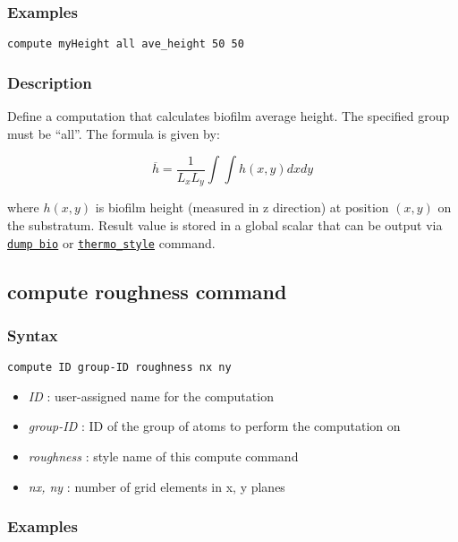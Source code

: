 \documentclass[11pt,a4paper,openright]{article}
\begin{document}
\subsubsection*{Examples}

\begin{Verbatim}[frame=single]
compute myHeight all ave_height 50 50
\end{Verbatim}

\subsubsection*{Description}

Define a computation that calculates biofilm average height. 
The specified group must be  ``all''.
The formula is given by:

\[ \overline{h} = \frac{1}{L_xL_y} \int\int h(x,y)dxdy \]

where $h(x,y)$ is biofilm height (measured in z direction) at 
position $(x, y)$ on the substratum.   
Result value is stored in 
a global scalar that can be output via \hyperref[dumpbio]{\tt dump bio}
or \href{http://lammps.sandia.gov/doc/thermo_style.html}{\tt thermo\_style} command.

\newpage
\subsection{compute roughness command}
\label{croughness}

\subsubsection*{Syntax}
\begin{Verbatim}[frame=single]
compute ID group-ID roughness nx ny
\end{Verbatim}

\begin{itemize}  [nosep]
\item
	{\it ID }: user-assigned name for the computation
\item
	{\it group-ID }: ID of the group of atoms to perform the computation on
\item
	{\it roughness }: style name of this compute command
\item
	{\it nx, ny }: number of grid elements in x, y planes
\end{itemize}

\subsubsection*{Examples}
\end{document}
